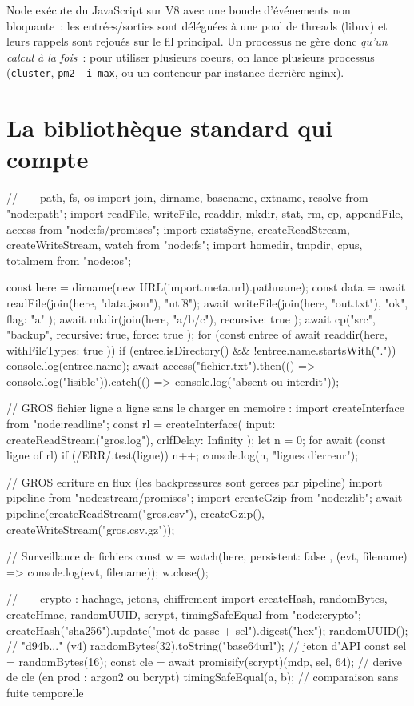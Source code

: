 \documentclass[12pt,a4paper,twoside,openright]{book}
\begin{document}
Node ex\'ecute du JavaScript sur V8 avec une boucle d'\'ev\'enements non bloquante~: les entr\'ees/sorties
sont d\'el\'egu\'ees \`a une pool de threads (libuv) et leurs rappels sont rejou\'es sur le fil principal.
Un processus ne g\`ere donc \emph{qu'un calcul \`a la fois}~: pour utiliser plusieurs coeurs, on lance
plusieurs processus (\verb|cluster|, \verb|pm2 -i max|, ou un conteneur par instance derri\`ere nginx).

\section{La biblioth\`eque standard qui compte}

\begin{codejs}
// ---- path, fs, os
import { join, dirname, basename, extname, resolve } from "node:path";
import { readFile, writeFile, readdir, mkdir, stat, rm, cp, appendFile, access } from "node:fs/promises";
import { existsSync, createReadStream, createWriteStream, watch } from "node:fs";
import { homedir, tmpdir, cpus, totalmem } from "node:os";

const here = dirname(new URL(import.meta.url).pathname);
const data = await readFile(join(here, "data.json"), "utf8");
await writeFile(join(here, "out.txt"), "ok\n", { flag: "a" });
await mkdir(join(here, "a/b/c"), { recursive: true });
await cp("src", "backup", { recursive: true, force: true });
for (const entree of await readdir(here, { withFileTypes: true })) {
  if (entree.isDirectory() && !entree.name.startsWith(".")) console.log(entree.name);
}
await access("fichier.txt").then(() => console.log("lisible")).catch(() => console.log("absent ou interdit"));

// GROS fichier ligne a ligne sans le charger en memoire :
import { createInterface } from "node:readline";
const rl = createInterface({ input: createReadStream("gros.log"), crlfDelay: Infinity });
let n = 0;
for await (const ligne of rl) if (/ERR/.test(ligne)) n++;
console.log(n, "lignes d'erreur");

// GROS ecriture en flux (les backpressures sont gerees par pipeline)
import { pipeline } from "node:stream/promises";
import { createGzip } from "node:zlib";
await pipeline(createReadStream("gros.csv"), createGzip(), createWriteStream("gros.csv.gz"));

// Surveillance de fichiers
const w = watch(here, { persistent: false }, (evt, filename) => console.log(evt, filename));
w.close();

// ---- crypto : hachage, jetons, chiffrement
import { createHash, randomBytes, createHmac, randomUUID, scrypt, timingSafeEqual } from "node:crypto";
createHash("sha256").update("mot de passe + sel").digest("hex");
randomUUID();                       // "d94b..." (v4)
randomBytes(32).toString("base64url");   // jeton d'API
const sel = randomBytes(16);
const cle = await promisify(scrypt)(mdp, sel, 64);   // derive de cle (en prod : argon2 ou bcrypt)
timingSafeEqual(a, b);              // comparaison sans fuite temporelle


\end{codejs}
\end{document}
